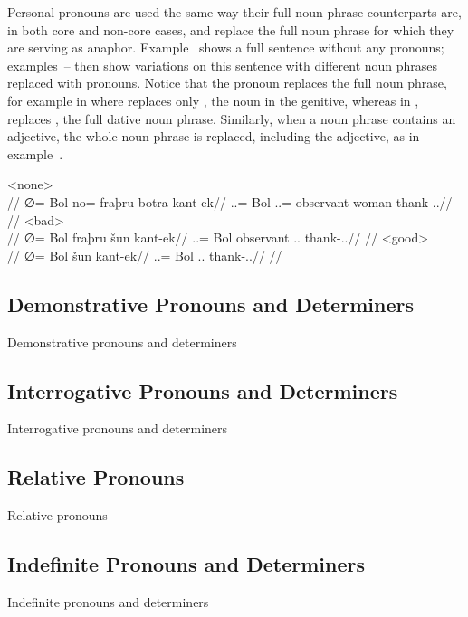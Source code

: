 Personal pronouns are used the same way their full noun phrase counterparts are, in both core and non-core cases, and replace the full noun phrase for which they are serving as anaphor. Example~ shows a full sentence without any pronouns; examples~– then show variations on this sentence with different noun phrases replaced with pronouns. Notice that the pronoun replaces the full noun phrase, for example in  where  replaces only , the noun in the genitive, whereas in ,  replaces , the full dative noun phrase. Similarly, when a noun phrase contains an adjective, the whole noun phrase is replaced, including the adjective, as in example~.

	\a<none>\begingl
		\glpreamble{}\\
		//
		\gla ∅= Bol no= fraþru botra kant-ek//
		\glb \An.\Sg.\Abs= Bol \An.\Sg.\Top= observant woman thank-\Ind.\Pst.\Ipfv//
		\glft{}//
	\endgl
	\a<bad>\begingl
		\glpreamble\ljudge{\ungr}\\
		//
		\gla ∅= Bol fraþru šun kant-ek//
		\glb \An.\Sg.\Abs= Bol observant \Tps.\An.\Top{} thank-\Ind.\Pst.\Ipfv//
		\glft\ljudge{\ungr}//
	\endgl
	\a<good>\begingl
		\glpreamble{}\\
		//
		\gla ∅= Bol šun kant-ek//
		\glb \An.\Sg.\Abs= Bol \Tps.\An.\Top{} thank-\Ind.\Pst.\Ipfv//
		\glft{}//
	\endgl
\xe

\subsection{Demonstrative Pronouns and Determiners}
\label{subsec:tvk-demonstrative-pronouns-determiners}

Demonstrative pronouns and determiners

\subsection{Interrogative Pronouns and Determiners}
\label{subsec:tvk-interrogative-pronouns-determiners}

Interrogative pronouns and determiners

\subsection{Relative Pronouns}
\label{subsec:tvk-relative-pronouns}

Relative pronouns

\subsection{Indefinite Pronouns and Determiners}
\label{subsec:tvk-indefinite-pronouns-determiners}

Indefinite pronouns and determiners

